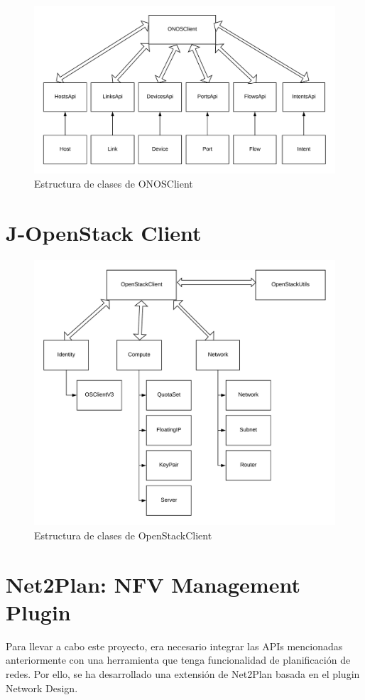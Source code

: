 \begin{figure}[!ht]
	\centering
	\includegraphics[width=0.8\linewidth]{imagenes/ONOSClient}
	\caption{Estructura de clases de ONOSClient}
	\label{fig:onosclient}
\end{figure}


\section{J-OpenStack Client}
\label{sec:openstackclient}

\begin{figure}[!ht]
	\centering
	\includegraphics[width=0.8\linewidth]{imagenes/OpenStackClient}
	\caption{Estructura de clases de OpenStackClient}
	\label{fig:openstackclient}
\end{figure}

\section{Net2Plan: NFV Management Plugin}
\label{sec:nfvplugin}

Para llevar a cabo este proyecto, era necesario integrar las APIs mencionadas anteriormente con una herramienta que tenga funcionalidad de planificación de redes. Por ello, se ha desarrollado una extensión de Net2Plan basada en el plugin Network Design.


